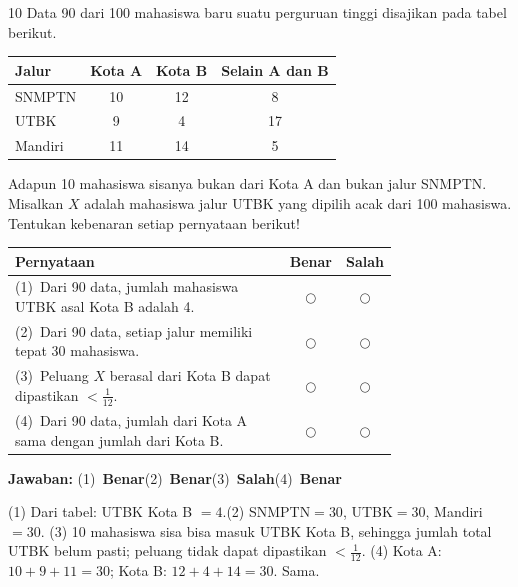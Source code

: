 \documentclass[11pt]{article}
\newcommand{\jawaban}[1]{%
  \noindent\colorbox{gold!30}{\parbox{\dimexpr\linewidth-2\fboxsep\relax}{%
    \textbf{Jawaban:} #1}}\par\smallskip}
\begin{document}
\begin{soal}{10}
Data 90 dari 100 mahasiswa baru suatu perguruan tinggi disajikan
pada tabel berikut.
\begin{center}
\begin{tabular}{l|ccc}
\hline
Jalur   & Kota A & Kota B & Selain A dan B \\
\hline
SNMPTN  & 10 & 12 &  8 \\
UTBK    &  9 &  4 & 17 \\
Mandiri & 11 & 14 &  5 \\
\hline
\end{tabular}
\end{center}
Adapun 10 mahasiswa sisanya bukan dari Kota A dan bukan jalur SNMPTN.
Misalkan $X$ adalah mahasiswa jalur UTBK yang dipilih acak dari 100
mahasiswa. Tentukan kebenaran setiap pernyataan berikut!

\par\smallskip
{\renewcommand{\arraystretch}{1.4}%
\begin{tabular}{@{}p{0.76\linewidth}cc@{}}
\hline
\textbf{Pernyataan} & \textbf{Benar} & \textbf{Salah}\\
\hline
(1)~Dari 90 data, jumlah mahasiswa UTBK asal Kota B adalah 4.
  & $\bigcirc$ & $\bigcirc$\\
(2)~Dari 90 data, setiap jalur memiliki tepat 30 mahasiswa.
  & $\bigcirc$ & $\bigcirc$\\
(3)~Peluang $X$ berasal dari Kota B dapat dipastikan $<\tfrac{1}{12}$.
  & $\bigcirc$ & $\bigcirc$\\
(4)~Dari 90 data, jumlah dari Kota A sama dengan jumlah dari Kota B.
  & $\bigcirc$ & $\bigcirc$\\
\hline
\end{tabular}}
\end{soal}
\begin{pembox}
\jawaban{(1)~\textbf{Benar}\quad(2)~\textbf{Benar}\quad(3)~\textbf{Salah}\quad(4)~\textbf{Benar}}
(1) Dari tabel: UTBK Kota B $=4$.\;(2) SNMPTN$=30$, UTBK$=30$, Mandiri$=30$.
(3) 10 mahasiswa sisa bisa masuk UTBK Kota B, sehingga jumlah total UTBK belum pasti; peluang tidak dapat dipastikan $<\tfrac{1}{12}$.
(4) Kota A: $10{+}9{+}11=30$; Kota B: $12{+}4{+}14=30$. Sama.
\end{pembox}
\end{document}
